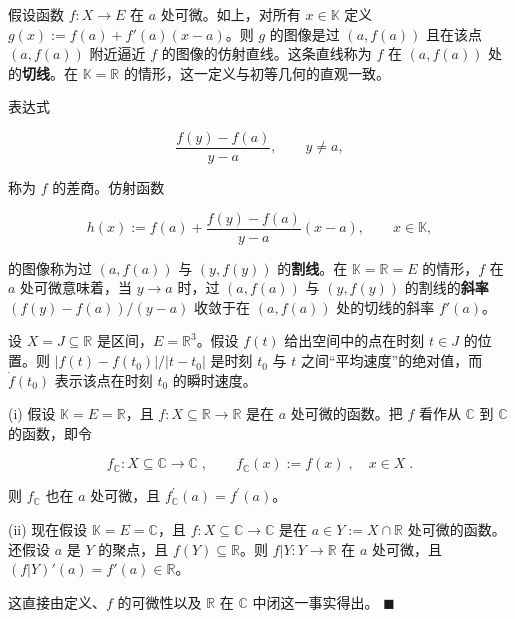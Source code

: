 \begin{remark}

\begin{items}
\item

假设函数 $f: X \to E$ 在 $a$ 处可微。如上，对所有 $x \in \mathbb{K}$ 定义 $g(x) := f(a) + f'(a)(x - a)$。则 $g$ 的图像是过 $(a, f(a))$ 且在该点 $(a, f(a))$ 附近逼近 $f$ 的图像的仿射直线。这条直线称为 $f$ 在 $(a, f(a))$ 处的\textbf{切线}。在 $\mathbb{K} = \mathbb{R}$ 的情形，这一定义与初等几何的直观一致。

\end{items}


表达式

\[
\frac{f(y)-f(a)}{y-a},\qquad y\neq a,
\]

称为 $f$ 的差商。仿射函数

\[
h(x):=f(a)+\frac{f(y)-f(a)}{y-a}(x-a),\qquad x\in\mathbb{K},
\]

的图像称为过 $ (a, f(a)) $ 与 $ (y, f(y)) $ 的\textbf{割线}。在 $ \mathbb{K} = \mathbb{R} = E $ 的情形，$ f $ 在 $ a $ 处可微意味着，当 $ y \to a $ 时，过 $ (a, f(a)) $ 与 $ (y, f(y)) $ 的割线的\textbf{斜率} $ (f(y) - f(a)) / (y - a) $ 收敛于在 $ (a, f(a)) $ 处的切线的斜率 $ f'(a) $。

\begin{items}
\item[（b）]

设 $ X = J \subseteq \mathbb{R} $ 是区间，$ E = \mathbb{R}^3 $。假设 $ f(t) $ 给出空间中的点在时刻 $ t \in J $ 的位置。则 $ |f(t) - f(t_0)| / |t - t_0| $ 是时刻 $ t_0 $ 与 $ t $ 之间“平均速度”的绝对值，而 $ \dot{f}(t_0) $ 表示该点在时刻 $ t_0 $ 的瞬时速度。

\item[（c）]

(i) 假设 $ \mathbb{K} = E = \mathbb{R} $，且 $ f: X \subseteq \mathbb{R} \to \mathbb{R} $ 是在 $ a $ 处可微的函数。把 $ f $ 看作从 $ \mathbb{C} $ 到 $ \mathbb{C} $ 的函数，即令

\[
f_{\mathbb{C}}\colon X\subseteq\mathbb{C}\to\mathbb{C}\;,\qquad f_{\mathbb{C}}(x):=f(x)\;,\quad x\in X\;.
\]

则 $ f_{\mathbb{C}} $ 也在 $ a $ 处可微，且 $ f_{\mathbb{C}}^{\prime}(a) = f^{\prime}(a) $。

\end{items}

(ii) 现在假设 $ \mathbb{K} = E = \mathbb{C} $，且 $ f: X \subseteq \mathbb{C} \to \mathbb{C} $ 是在 $ a \in Y := X \cap \mathbb{R} $ 处可微的函数。还假设 $ a $ 是 $ Y $ 的聚点，且 $ f(Y) \subseteq \mathbb{R} $。则 $ f|Y: Y \to \mathbb{R} $ 在 $ a $ 处可微，且 $ (f|Y)'(a) = f'(a) \in \mathbb{R} $。

\proofhead
这直接由定义、$ f $ 的可微性以及 $ \mathbb{R} $ 在 $ \mathbb{C} $ 中闭这一事实得出。 $ \blacksquare $
\end{remark}

